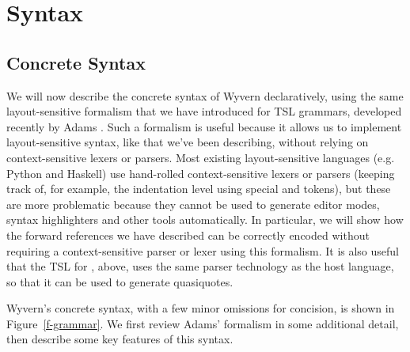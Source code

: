 \section{Syntax}
\label{s:approach}

\subsection{Concrete Syntax}
We will now describe the concrete syntax of Wyvern declaratively, using the same layout-sensitive formalism that we have introduced for TSL grammars, developed recently by Adams \cite{Adams:2013:PPI:2429069.2429129}. Such a formalism is useful because it allows us to implement  layout-sensitive syntax, like that we've been describing, without relying on context-sensitive lexers or parsers. Most existing layout-sensitive languages (e.g. Python and Haskell) use hand-rolled context-sensitive lexers or parsers (keeping track of, for example, the indentation level using special  and  tokens), but these are more problematic because they cannot be used to generate editor modes, syntax highlighters and other tools automatically. In particular, we will show how the forward references we have described can be correctly encoded without requiring a context-sensitive parser or lexer using this formalism. It is also useful that the TSL for , above, uses the same parser technology as the host language, so that it can be used to generate quasiquotes.

Wyvern's concrete syntax, with a few minor omissions for concision, is shown in Figure~\ref{f-grammar}. We first review Adams' formalism in some additional detail, then describe some key features of this syntax.

